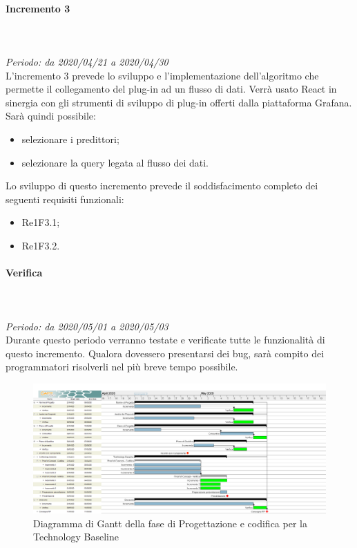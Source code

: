 \paragraph{Incremento 3}\mbox{} \\ \mbox{} \\ 
\textit{Periodo: da 2020/04/21 a 2020/04/30}\\
L’incremento 3 prevede lo sviluppo e l’implementazione dell'algoritmo che permette il collegamento del plug-in ad un flusso di dati. Verrà usato React in sinergia con gli strumenti di sviluppo di plug-in offerti dalla piattaforma Grafana. \\
Sarà quindi possibile:
\begin{itemize}
	\item selezionare i predittori;
	\item selezionare la query legata al flusso dei dati.
\end{itemize}
Lo sviluppo di questo incremento prevede il soddisfacimento completo dei seguenti requisiti funzionali:
\begin{itemize}
\item Re1F3.1;
\item Re1F3.2.
\end{itemize}
\paragraph*{Verifica}\mbox{} \\ \mbox{} \\ 
\textit{Periodo: da 2020/05/01 a 2020/05/03}\\
Durante questo periodo verranno testate e verificate tutte le funzionalità di questo incremento. Qualora dovessero presentarsi dei bug, sarà compito dei programmatori risolverli nel più breve tempo possibile.

\begin{figure}[H]
\centering
\includegraphics[scale=0.24]{./img/gantt/progettazione_architetturale.png}
\caption{Diagramma di Gantt della fase di Progettazione e codifica per la Technology Baseline}
\end{figure}

